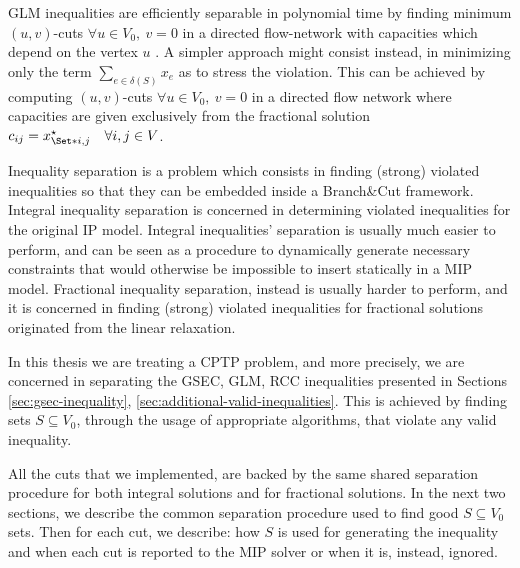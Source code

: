 GLM inequalities are efficiently separable in
polynomial time by finding minimum
$(u, v)$-cuts $\forall u \in V_0,\ v = 0$
in a directed flow-network with capacities which depend on the vertex $u$
\parencite{letchford2006, jepsen2014}.
A simpler approach might consist instead,
in minimizing only the term $\sum_{e \in \delta(S)} x_e$ as to stress the violation.
This can be achieved by computing $(u, v)$-cuts $\forall u \in V_0,\ v = 0$
in a directed flow network where capacities are given exclusively from the
fractional solution $c_{ij} = x^\star _{\Set*{i, j}}\quad \forall i, j \in V$.

Inequality separation is a problem which consists in finding (strong) violated inequalities so that they can be embedded inside a Branch\&Cut framework.
Integral inequality separation is concerned in determining violated inequalities for the original IP model.
Integral inequalities' separation is usually much easier to perform, and can be seen as a procedure to dynamically generate necessary constraints that would otherwise be impossible to insert statically in a MIP model.
Fractional inequality separation, instead is usually harder to perform, and it is concerned in finding (strong) violated inequalities for fractional solutions originated from the linear relaxation.

In this thesis we are treating a CPTP problem, and more precisely, we are concerned in separating the GSEC, GLM, RCC inequalities presented in Sections \ref{sec:gsec-inequality}, \ref{sec:additional-valid-inequalities}.
This is achieved by finding sets $S \subseteq V_0$, through the usage of appropriate algorithms, that violate any valid inequality.

All the cuts that we implemented, are backed by the same shared separation procedure for both integral solutions and for fractional solutions.
In the next two sections, we describe the common separation procedure used to find good $S \subseteq V_0$ sets.
Then for each cut, we describe: how $S$ is used for generating the inequality and when each cut is reported to the MIP solver or when it is, instead, ignored.

